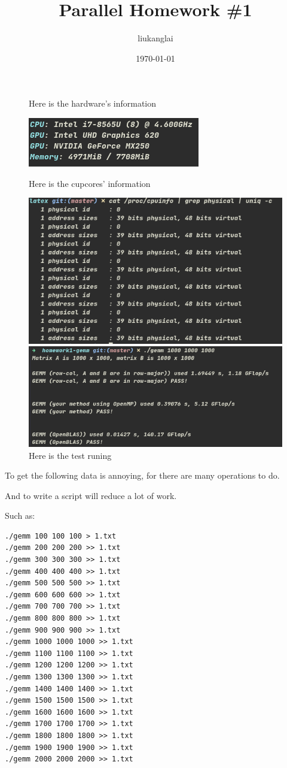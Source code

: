 \documentclass[12pt]{article}
\title{Parallel Homework \#1}
\author{liukanglai}
\date{\today}
\begin{document}
\maketitle

\newpage

\begin{figure}[h]
\centering
\caption{Here is the hardware's information}
\includegraphics[scale=0.5]{HardwareInfo}
\caption{Here is the cupcores' information}
\includegraphics[scale=0.5]{cup_cores}
\caption{Here is the test runing}
\includegraphics[scale=0.5]{testrunning}
\end{figure}


To get the following data is annoying, for there are many operations to do.

And to write a script will reduce a lot of work.

\newpage
Such as: 

\begin{lstlisting}
./gemm 100 100 100 > 1.txt
./gemm 200 200 200 >> 1.txt
./gemm 300 300 300 >> 1.txt
./gemm 400 400 400 >> 1.txt
./gemm 500 500 500 >> 1.txt
./gemm 600 600 600 >> 1.txt
./gemm 700 700 700 >> 1.txt
./gemm 800 800 800 >> 1.txt
./gemm 900 900 900 >> 1.txt
./gemm 1000 1000 1000 >> 1.txt
./gemm 1100 1100 1100 >> 1.txt
./gemm 1200 1200 1200 >> 1.txt
./gemm 1300 1300 1300 >> 1.txt
./gemm 1400 1400 1400 >> 1.txt
./gemm 1500 1500 1500 >> 1.txt
./gemm 1600 1600 1600 >> 1.txt
./gemm 1700 1700 1700 >> 1.txt
./gemm 1800 1800 1800 >> 1.txt
./gemm 1900 1900 1900 >> 1.txt
./gemm 2000 2000 2000 >> 1.txt
\end{lstlisting}
\end{document}
